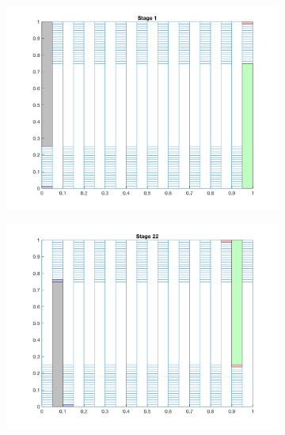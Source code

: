 \documentclass[11pt, letterpaper,titlepage,oneside]{article}
\begin{document}
\begin{figure}[H]
  \centering
  \begin{subfigure}{0.49\textwidth}
  \includegraphics[scale=0.5]{../figures/worst_partition_1.png}
  \end{subfigure}
  \begin{subfigure}{0.49\textwidth}
  \includegraphics[scale=0.5]{../figures/worst_partition_2.png}
  \end{subfigure}
  \begin{subfigure}{0.49\textwidth}

\end{subfigure}
\end{figure}
\end{document}
